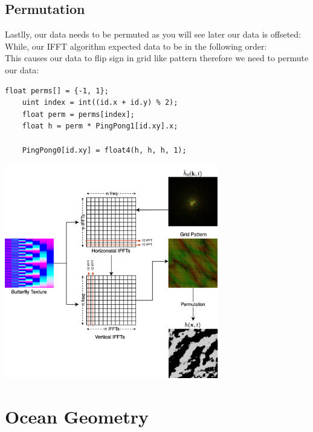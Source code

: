\subsection*{Permutation}
Lastlly, our data needs to be permuted as you will see later our data is offseted:
\begin{equation}
    [\text{freq} (-N / 2), \text{ ...}, \text{ freq} (-1), \text{ freq} (0), \text{ freq} (1), \text{ ...}, \text{ freq} (N / 2 - 1)]
\end{equation}
While, our IFFT algorithm expected data to be in the following order:
\begin{equation}
    [\text{freq} (0), \text{ freq} (1), \text{ ...}, \text{ freq}(N - 1)]
\end{equation}
This causes our data to flip sign in grid like pattern therefore we need to permute our data:
\begin{lstlisting}[caption={Data Permutation \cite{flugge2017} }, frame=single, numberstyle=\small\color{gray}, captionpos=b]
    float perms[] = {-1, 1};
    uint index = int((id.x + id.y) % 2);
    float perm = perms[index];
    float h = perm * PingPong1[id.xy].x;
    
    PingPong0[id.xy] = float4(h, h, h, 1);
\end{lstlisting}

\begin{minipage}{1\textwidth}
    \centering
    \includegraphics[width=0.7\textwidth]{"images/ifft_algorithm.png"}
    \label{fig:ifft_algorithm}
\end{minipage}

\section{Ocean Geometry}
